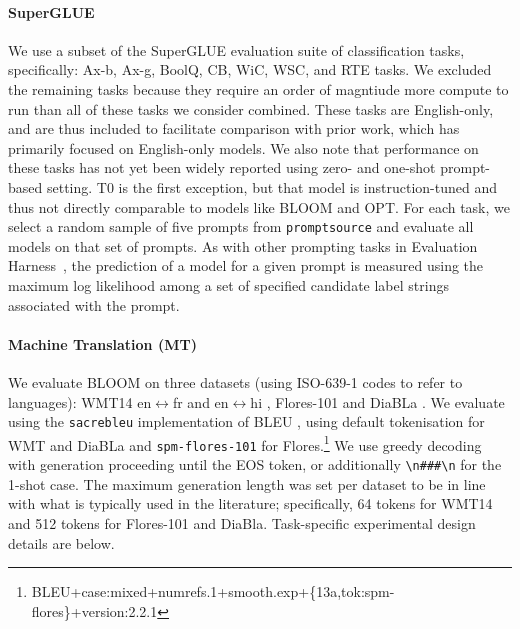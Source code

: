 \documentclass[twoside,11pt]{article}
\begin{document}
\paragraph{SuperGLUE} We use a subset of the SuperGLUE \citep{wang-et-al-2019-superglue} evaluation suite of classification tasks, specifically: Ax-b, Ax-g, BoolQ, CB, WiC, WSC, and RTE tasks.
We excluded the remaining tasks because they require an order of magntiude more compute to run than all of these tasks we consider combined.
These tasks are English-only, and are thus included to facilitate comparison with prior work, which has primarily focused on English-only models. We also note that performance on these tasks has not yet been widely reported using zero- and one-shot prompt-based setting. T0 \citep{sanh2022multitask} is the first exception, but that model is instruction-tuned and thus not directly comparable to models like BLOOM and OPT. For each task, we select a random sample of five prompts from \texttt{promptsource} and evaluate all models on that set of prompts.
As with other prompting tasks in Evaluation Harness~\citep{eval-harness}, the prediction of a model for a given prompt is measured using the maximum log likelihood among a set of specified candidate label strings associated with the prompt. 

\paragraph{Machine Translation (MT)} We evaluate BLOOM on three datasets (using ISO-639-1 codes to refer to languages): WMT14 en$\leftrightarrow$fr and en$\leftrightarrow$hi \citep{bojar-etal-2014-findings}, Flores-101 \citep{goyal-etal-2022-flores} and DiaBLa \citep{bawden-et-al-2020-diabla}. We evaluate using the \texttt{sacrebleu} \citep{post-2018-call} implementation of BLEU \citep{papineni-etal-2002-bleu}, using default tokenisation for WMT and DiaBLa and \texttt{spm-flores-101} for Flores.\footnote{BLEU+case:mixed+numrefs.1+smooth.exp+\{13a,tok:spm-flores\}+version:2.2.1} We use greedy decoding with generation proceeding until the EOS token, or additionally \texttt{\textbackslash n\#\#\#\textbackslash n} for the 1-shot case. The maximum generation length was set per dataset to be in line with what is typically used in the literature; specifically, 64 tokens for WMT14 and 512 tokens for Flores-101 and DiaBla.
Task-specific experimental design details are below.
\end{document}

